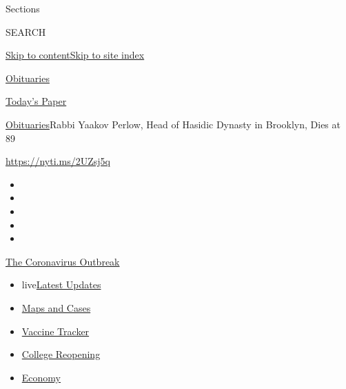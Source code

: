 Sections

SEARCH

\protect\hyperlink{site-content}{Skip to
content}\protect\hyperlink{site-index}{Skip to site index}

\href{https://www.nytimes3xbfgragh.onion/section/obituaries}{Obituaries}

\href{https://myaccount.nytimes3xbfgragh.onion/auth/login?response_type=cookie\&client_id=vi}{}

\href{https://www.nytimes3xbfgragh.onion/section/todayspaper}{Today's
Paper}

\href{/section/obituaries}{Obituaries}\textbar{}Rabbi Yaakov Perlow,
Head of Hasidic Dynasty in Brooklyn, Dies at 89

\url{https://nyti.ms/2UZsj5q}

\begin{itemize}
\item
\item
\item
\item
\item
\end{itemize}

\href{https://www.nytimes3xbfgragh.onion/news-event/coronavirus?action=click\&pgtype=Article\&state=default\&region=TOP_BANNER\&context=storylines_menu}{The
Coronavirus Outbreak}

\begin{itemize}
\tightlist
\item
  live\href{https://www.nytimes3xbfgragh.onion/2020/08/04/world/coronavirus-covid-19.html?action=click\&pgtype=Article\&state=default\&region=TOP_BANNER\&context=storylines_menu}{Latest
  Updates}
\item
  \href{https://www.nytimes3xbfgragh.onion/interactive/2020/us/coronavirus-us-cases.html?action=click\&pgtype=Article\&state=default\&region=TOP_BANNER\&context=storylines_menu}{Maps
  and Cases}
\item
  \href{https://www.nytimes3xbfgragh.onion/interactive/2020/science/coronavirus-vaccine-tracker.html?action=click\&pgtype=Article\&state=default\&region=TOP_BANNER\&context=storylines_menu}{Vaccine
  Tracker}
\item
  \href{https://www.nytimes3xbfgragh.onion/2020/08/02/us/covid-college-reopening.html?action=click\&pgtype=Article\&state=default\&region=TOP_BANNER\&context=storylines_menu}{College
  Reopening}
\item
  \href{https://www.nytimes3xbfgragh.onion/live/2020/08/03/business/stock-market-today-coronavirus?action=click\&pgtype=Article\&state=default\&region=TOP_BANNER\&context=storylines_menu}{Economy}
\end{itemize}

